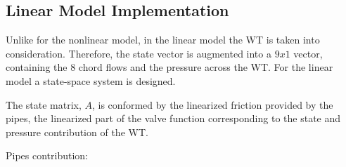 %
%
%
%		
%
%
%
%
%		
%





\subsection{Linear Model Implementation}
\label{MatlabScriptLinear}

Unlike for the nonlinear model, in the linear model the WT is taken into consideration. Therefore, the state vector is augmented into a $9x1$ vector, 
containing the 8 chord flows and the pressure across the WT. For the linear model a state-space system is designed.

The state matrix, $A$, is conformed by the linearized friction provided by the pipes, the linearized part of the valve function corresponding to the state and pressure contribution
of the WT.

Pipes contribution:

